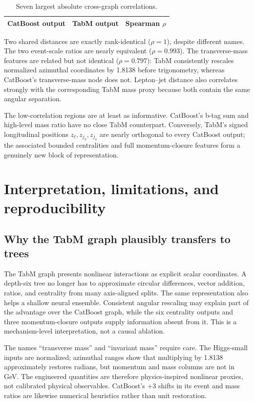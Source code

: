 \documentclass[10pt]{article}
\begin{document}
\begin{table}[H]
\centering
\small
\begin{tabular}{llr}
\toprule
CatBoost output & TabM output & Spearman $\rho$ \\
\midrule

\end{tabular}
\caption{Seven largest absolute cross-graph correlations.}
\label{tab:correlations}
\end{table}

Two shared distances are exactly rank-identical ($\rho=1$), despite different
names.  The two event-scale ratios are nearly equivalent
($\rho=0.993$).  The transverse-mass features are related but not identical
($\rho=0.797$): TabM consistently rescales normalized azimuthal coordinates
by 1.8138 before trigonometry, whereas CatBoost's transverse-mass node does
not.  Lepton--jet distance also correlates strongly with the corresponding
TabM mass proxy because both contain the same angular separation.

The low-correlation regions are at least as informative.  CatBoost's b-tag
sum and high-level mass ratio have no close TabM counterpart.  Conversely,
TabM's signed longitudinal positions $z_\ell,z_{j_3},z_{j_4}$ are nearly
orthogonal to every CatBoost output; the associated bounded centralities and
full momentum-closure features form a genuinely new block of representation.

\section{Interpretation, limitations, and reproducibility}

\subsection{Why the TabM graph plausibly transfers to trees}

The TabM graph presents nonlinear interactions as explicit scalar
coordinates.  A depth-six tree no longer has to approximate circular
differences, vector addition, ratios, and centrality from many axis-aligned
splits.  The same representation also helps a shallow neural ensemble.
Consistent angular rescaling may explain part of the advantage over the
CatBoost graph, while the six centrality outputs and three momentum-closure
outputs supply information absent from it.  This is a mechanism-level
interpretation, not a causal ablation.

The names ``transverse mass'' and ``invariant mass'' require care.  The
Higgs-small inputs are normalized; azimuthal ranges show that multiplying by
1.8138 approximately restores radians, but momentum and mass columns are not
in GeV.  The engineered quantities are therefore physics-inspired nonlinear
proxies, not calibrated physical observables.  CatBoost's $+3$ shifts in its
event and mass ratios are likewise numerical heuristics rather than unit
restoration.
\end{document}
